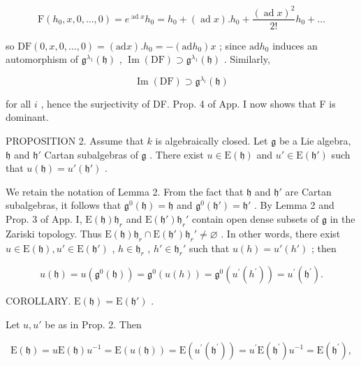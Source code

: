 \[
\mathrm{F} (h _ {0}, x, 0, \dots , 0) = e ^ {\operatorname{ad} x} h _ {0} = h _ {0} + (\operatorname{ad} x). h _ {0} + \frac {(\operatorname{ad} x) ^ {2}}{2 !} h _ {0} + \dots
\]

so \(\mathrm{DF}(0,x,0,\ldots ,0) = (\mathrm{ad}x).h_0 = -(\mathrm{ad}h_0)x\) ; since \(\mathrm{ad}h_0\) induces an automorphism of \(\mathfrak{g}^{\lambda_1}(\mathfrak{h})\) , \(\operatorname {Im}(\mathrm{DF})\supset \mathfrak{g}^{\lambda_1}(\mathfrak{h})\) . Similarly,

\[
\operatorname{Im} (\mathrm{DF}) \supset \mathfrak {g} ^ {\lambda_ {i}} (\mathfrak {h})
\]

for all \(i\) , hence the surjectivity of DF. Prop. 4 of App. I now shows that F is dominant.

PROPOSITION 2. Assume that \(k\) is algebraically closed. Let \(\mathfrak{g}\) be a Lie algebra, \(\mathfrak{h}\) and \(\mathfrak{h}'\) Cartan subalgebras of \(\mathfrak{g}\) . There exist \(u \in \mathrm{E}(\mathfrak{h})\) and \(u' \in \mathrm{E}(\mathfrak{h}')\) such that \(u(\mathfrak{h}) = u'(\mathfrak{h}')\) .

We retain the notation of Lemma 2. From the fact that \(\mathfrak{h}\) and \(\mathfrak{h}'\) are Cartan subalgebras, it follows that \(\mathfrak{g}^0 (\mathfrak{h}) = \mathfrak{h}\) and \(\mathfrak{g}^0 (\mathfrak{h}') = \mathfrak{h}'\) . By Lemma 2 and Prop. 3 of App. I, \(\mathrm{E}(\mathfrak{h})\mathfrak{h}_r\) and \(\mathrm{E}(\mathfrak{h}')\mathfrak{h}_r'\) contain open dense subsets of \(\mathfrak{g}\) in the Zariski topology. Thus \(\mathrm{E}(\mathfrak{h})\mathfrak{h}_r\cap \mathrm{E}(\mathfrak{h}')\mathfrak{h}_r' \neq \varnothing\) . In other words, there exist \(u\in \mathrm{E}(\mathfrak{h}), u' \in \mathrm{E}(\mathfrak{h}')\) , \(h\in \mathfrak{h}_r\) , \(h' \in \mathfrak{h}_r'\) such that \(u(h) = u'(h')\) ; then

\[
u (\mathfrak {h}) = u \left(\mathfrak {g} ^ {0} (\mathfrak {h})\right) = \mathfrak {g} ^ {0} (u (h)) = \mathfrak {g} ^ {0} \left(u ^ {\prime} \left(h ^ {\prime}\right)\right) = u ^ {\prime} \left(\mathfrak {h} ^ {\prime}\right).
\]

COROLLARY. \(\mathrm{E}(\mathfrak{h}) = \mathrm{E}(\mathfrak{h}')\) .

Let \(u, u'\) be as in Prop. 2. Then

\[
\mathrm{E} (\mathfrak {h}) = u \mathrm{E} (\mathfrak {h}) u ^ {- 1} = \mathrm{E} (u (\mathfrak {h})) = \mathrm{E} (u ^ {\prime} (\mathfrak {h} ^ {\prime})) = u ^ {\prime} \mathrm{E} (\mathfrak {h} ^ {\prime}) u ^ {- 1} = \mathrm{E} (\mathfrak {h} ^ {\prime}),
\]

